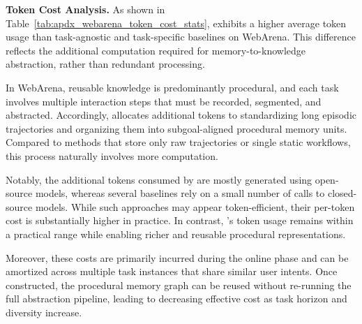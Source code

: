 \textbf{Token Cost Analysis.}
As shown in Table~\ref{tab:apdx_webarena_token_cost_stats}, \plugmem exhibits a higher average token usage than task-agnostic and task-specific baselines on WebArena. This difference reflects the additional computation required for memory-to-knowledge abstraction, rather than redundant processing.

In WebArena, reusable knowledge is predominantly procedural, and each task involves multiple interaction steps that must be recorded, segmented, and abstracted. Accordingly, \plugmem allocates additional tokens to standardizing long episodic trajectories and organizing them into subgoal-aligned procedural memory units. Compared to methods that store only raw trajectories or single static workflows, this process naturally involves more computation.

Notably, the additional tokens consumed by \plugmem are mostly generated using open-source models, whereas several baselines rely on a small number of calls to closed-source models. While such approaches may appear token-efficient, their per-token cost is substantially higher in practice. In contrast, \plugmem’s token usage remains within a practical range while enabling richer and reusable procedural representations.

Moreover, these costs are primarily incurred during the online phase and can be amortized across multiple task instances that share similar user intents. Once constructed, the procedural memory graph can be reused without re-running the full abstraction pipeline, leading to decreasing effective cost as task horizon and diversity increase.


\begin{table}[]
\centering
\caption{Token Cost Statistics on WebArena. (\~k tokens per sample)}
\label{tab:apdx_webarena_token_cost_stats}
\end{table}

